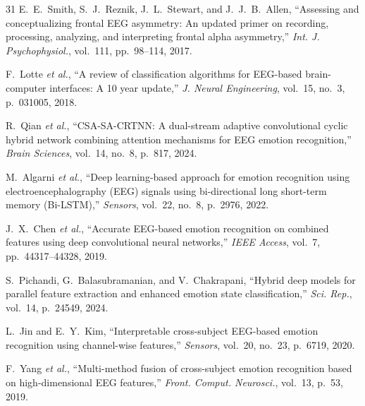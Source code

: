 \documentclass[conference,a4paper]{IEEEtran}
\begin{document}
\begin{thebibliography}{31}
E.~E.~Smith, S.~J.~Reznik, J.~L.~Stewart, and J.~J.~B.~Allen, ``Assessing and conceptualizing frontal EEG asymmetry: An updated primer on recording, processing, analyzing, and interpreting frontal alpha asymmetry,'' \emph{Int. J. Psychophysiol.}, vol.~111, pp.~98--114, 2017.

F.~Lotte \emph{et al.}, ``A review of classification algorithms for EEG-based brain-computer interfaces: A 10 year update,'' \emph{J. Neural Engineering}, vol.~15, no.~3, p.~031005, 2018.

R.~Qian \emph{et al.}, ``CSA-SA-CRTNN: A dual-stream adaptive convolutional cyclic hybrid network combining attention mechanisms for EEG emotion recognition,'' \emph{Brain Sciences}, vol.~14, no.~8, p.~817, 2024.

M.~Algarni \emph{et al.}, ``Deep learning-based approach for emotion recognition using electroencephalography (EEG) signals using bi-directional long short-term memory (Bi-LSTM),'' \emph{Sensors}, vol.~22, no.~8, p.~2976, 2022.

J.~X.~Chen \emph{et al.}, ``Accurate EEG-based emotion recognition on combined features using deep convolutional neural networks,'' \emph{IEEE Access}, vol.~7, pp.~44317--44328, 2019.

S.~Pichandi, G.~Balasubramanian, and V.~Chakrapani, ``Hybrid deep models for parallel feature extraction and enhanced emotion state classification,'' \emph{Sci. Rep.}, vol.~14, p.~24549, 2024.

L.~Jin and E.~Y.~Kim, ``Interpretable cross-subject EEG-based emotion recognition using channel-wise features,'' \emph{Sensors}, vol.~20, no.~23, p.~6719, 2020.

F.~Yang \emph{et al.}, ``Multi-method fusion of cross-subject emotion recognition based on high-dimensional EEG features,'' \emph{Front. Comput. Neurosci.}, vol.~13, p.~53, 2019.

\end{thebibliography}
\end{document}
